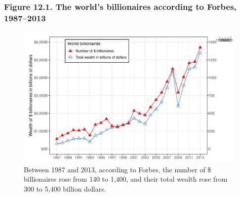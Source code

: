 \documentclass[t]{beamer}\usepackage[]{graphicx}\usepackage[]{color}
\newenvironment{knitrout}{}{} %
\begin{document}
\begin{frame}[label=Figure_12_1]
\frametitle{Figure 12.1. The world's billionaires according to Forbes, 1987--2013}
\begin{figure}[t]
\begin{minipage}[b]{\textwidth}
\centering

\begin{knitrout}\footnotesize
{}\color{fgcolor}

{\centering \includegraphics[width=1\linewidth]{figures/color/Figure_12_1} 

}



\end{knitrout}
\caption{Between 1987 and 2013, according to Forbes, the number of \$ billionaires rose from 140 to 1,400, and their total wealth rose from 300 to 5,400 billion dollars.}
\end{minipage}
\end{figure}
\end{frame}
\end{document}
